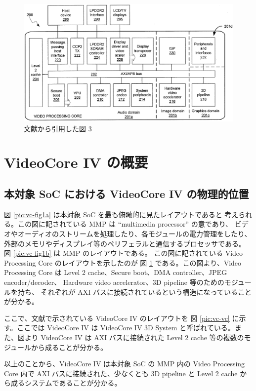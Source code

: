 \documentclass{jsarticle}
\begin{document}
\begin{figure}
\includegraphics[width=\textwidth]{vc-fig2.png}
\caption{文献\cite{vc-patent}から引用した図 3}
\label{pic:vc-fig2}
\end{figure}


\section{VideoCore IV の概要}

\subsection{本対象 SoC における VideoCore IV の物理的位置}

図 \ref{pic:vc-fig1a} は本対象 SoC を最も俯瞰的に見たレイアウトであると
考えられる。この図に記されている MMP は ``multimedia processor'' の意であり、
ビデオやオーディオのストリームを処理したり、各モジュールの電力管理をしたり、
外部のメモリやディスプレイ等のペリフェラルと通信するプロセッサである。
図 \ref{pic:vc-fig1b} は MMP のレイアウトである。
この図に記されている Video Processing Core のレイアウトを示したのが
図 \ref{pic:vc-fig2} である。この図より、Video Processing Core は
Level 2 cache、Secure boot、DMA controller、JPEG encoder/decoder、
Hardware video accelerator、3D pipeline 等のためのモジュールを持ち、
それぞれが AXI バスに接続されているという構造になっていることが分かる。

ここで、文献で示されている VideoCore IV のレイアウトを
図 \ref{pic:vc-vc} に示す。ここでは VideoCore IV は
VideoCore IV 3D System と呼ばれている。また、図より VideoCore IV は
AXI バスに接続された Level 2 cache 等の複数のモジュールから成ることが分かる。

以上のことから、VideoCore IV は本対象 SoC の MMP 内の
Video Processing Core 内で AXI バスに接続された、少なくとも
3D pipeline と Level 2 cache から成るシステムであることが分かる。




\end{document}
